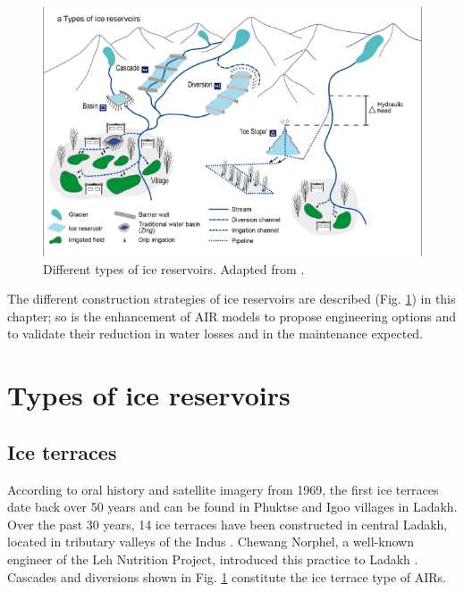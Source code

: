\begin{figure}[htb]
	\centering
	\includegraphics[width=\textwidth]{figs/AIR_designs}
	\caption{Different types of ice reservoirs. Adapted from \citet{nusserSociohydrologyArtificialGlaciers2019}.}
	\label{fig:AIRdesigns}
\end{figure}

The different construction strategies of ice reservoirs are described (Fig.
\ref{fig:AIRdesigns}) in this chapter; so is the enhancement of AIR models to propose engineering options and to validate their
reduction in water losses and in the maintenance expected.

\section{Types of ice reservoirs}

\subsection{Ice terraces}

According to oral history and satellite imagery from 1969, the first ice terraces date back over 50 years and can
be found in Phuktse and Igoo villages in Ladakh. Over the past 30 years, 14 ice terraces have been constructed in central Ladakh,
located in tributary valleys of the Indus \citep{norphelArtificialGlacierHigh2009,
	nusserSociohydrologyArtificialGlaciers2019}. Chewang Norphel, a well-known engineer of the Leh Nutrition
Project, introduced this practice to Ladakh \citep{vinceGlacierMan2009}. Cascades and diversions shown in Fig.
\ref{fig:AIRdesigns} constitute the ice terrace type of AIRs.

